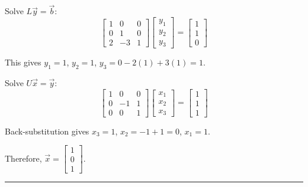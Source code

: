 \documentclass[reqno]{exam}
\begin{document}
\begin{questions}
\begin{solution}
    Solve $L\vec{y} = \vec{b}$:
    $$\begin{bmatrix} 1 & 0 & 0 \\ 0 & 1 & 0 \\ 2 & -3 & 1 \end{bmatrix} \begin{bmatrix} y_1 \\ y_2 \\ y_3 \end{bmatrix} = \begin{bmatrix} 1 \\ 1 \\ 0 \end{bmatrix}$$

    This gives $y_1 = 1$, $y_2 = 1$, $y_3 = 0 - 2(1) + 3(1) = 1$.

    Solve $U\vec{x} = \vec{y}$:
    $$\begin{bmatrix} 1 & 0 & 0 \\ 0 & -1 & 1 \\ 0 & 0 & 1 \end{bmatrix} \begin{bmatrix} x_1 \\ x_2 \\ x_3 \end{bmatrix} = \begin{bmatrix} 1 \\ 1 \\ 1 \end{bmatrix}$$

    Back-substitution gives $x_3 = 1$, $x_2 = -1 + 1 = 0$, $x_1 = 1$.

    Therefore, $\vec{x} = \begin{bmatrix} 1 \\ 0 \\ 1 \end{bmatrix}$.
  \end{solution}
  \newpage


  \:
  \vfill
  \hrule
 


\end{questions}
\end{document}
